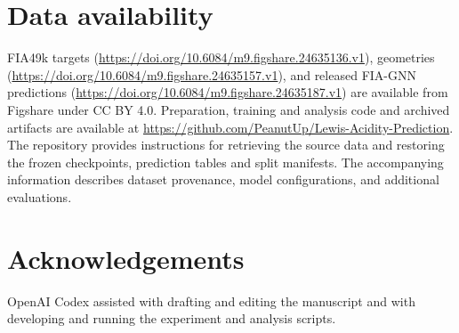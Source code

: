 \documentclass[twoside,twocolumn,9pt]{article}
\begin{document}
\section*{Data availability}
FIA49k targets (\url{https://doi.org/10.6084/m9.figshare.24635136.v1}), geometries (\url{https://doi.org/10.6084/m9.figshare.24635157.v1}), and released FIA-GNN predictions (\url{https://doi.org/10.6084/m9.figshare.24635187.v1}) are available from Figshare under CC BY 4.0. \cite{fia49ktargets,fia49kgeometries,fia49kpredictions} Preparation, training and analysis code and archived artifacts are available at \url{https://github.com/PeanutUp/Lewis-Acidity-Prediction}. The repository provides instructions for retrieving the source data and restoring the frozen checkpoints, prediction tables and split manifests. The accompanying information describes dataset provenance, model configurations, and additional evaluations.

\section*{Acknowledgements}
OpenAI Codex assisted with drafting and editing the manuscript and with developing and running the experiment and analysis scripts.


\end{document}
